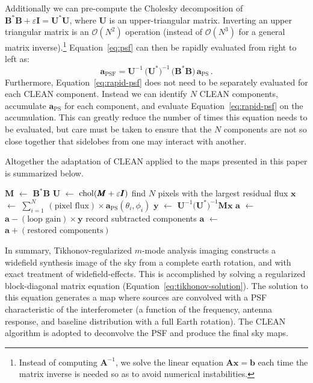 \documentclass[twocolumn]{aastex61}
\newcommand*\Let[2]{\State #1 $\gets$ #2}
\renewcommand{\b}{\pmb}
\begin{document}
Additionally we can pre-compute the Cholesky decomposition of $\b B^*\b B + \varepsilon\b I = \b
U^*\b U$, where $\b U$ is an upper-triangular matrix. Inverting an upper triangular matrix is an
$\mathcal{O}(N^2)$ operation (instead of $\mathcal{O}(N^3)$ for a general matrix inverse).\footnote{
    Instead of computing $\b A^{-1}$, we solve the linear equation $\b A\b x = \b b$ each time the
    matrix inverse is needed so as to avoid numerical instabilities.
}
Equation~\ref{eq:psf} can then be rapidly evaluated from right to left as:
\begin{equation}\label{eq:rapid-psf}
    \b a_\text{PSF} =
        \b U^{-1}\,\big(\b U^*\big)^{-1}\,\big(\b B^*\b B\big)\,\b a_\text{PS}\,.
\end{equation}
Furthermore, Equation~\ref{eq:rapid-psf} does not need to be separately evaluated for each CLEAN
component. Instead we can identify $N$ CLEAN components, accumulate $\b a_\text{PS}$ for each
component, and evaluate Equation~\ref{eq:rapid-psf} on the accumulation. This can greatly reduce the
number of times this equation needs to be evaluated, but care must be taken to ensure that the $N$
components are not so close together that sidelobes from one may interact with another.

Altogether the adaptation of CLEAN applied to the maps presented in this paper is summarized below.
\begin{algorithmic}[1]
    \Require{$\b a$ is the solution to Equation~\ref{eq:tikhonov-solution}}
    \Function{CLEAN}{$\b a$}
    \Let{$\b M$}{$\b B^*\b B$}
    \Let{$\b U$}{${\rm chol}(\b M + \varepsilon\b I)$} 
    \State find $N$ pixels with the largest residual flux
    \Let{$\b x$}{$\sum_{i=1}^N \,(\text{pixel flux}) \times \b a_\text{PS}(\theta_i, \phi_i)$}
    \Let{$\b y$}{$\b U^{-1}\big(\b U^*\big)^{-1}\b M\b x$}
    \Let{$\b a$}{$\b a - (\text{loop gain})\times\b y$}
    \State record subtracted components
    \EndWhile
    \Let{$\b a$}{$\b a + (\text{restored components})$}
    \State \Return{$\b a$}
    \EndFunction
\end{algorithmic}

In summary, Tikhonov-regularized $m$-mode analysis imaging constructs a widefield synthesis image of
the sky from a complete earth rotation, and  with exact treatment of widefield-effects. This is
accomplished by solving a regularized block-diagonal matrix equation
(Equation~\ref{eq:tikhonov-solution}). The solution to this equation generates a map where
sources are convolved with a PSF characteristic of the interferometer (a function of the frequency,
antenna response, and baseline distribution with a full Earth rotation). The CLEAN algorithm is
adopted to deconvolve the PSF and produce the final sky maps.
\end{document}
